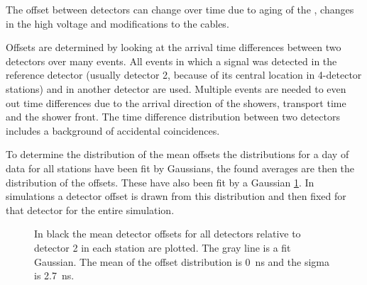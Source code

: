 The offset between detectors can change over time due to aging of the
\pmt, changes in the high voltage and modifications to the cables.

Offsets are determined by looking at the arrival time differences
between two detectors over many events. All events in which a signal was
detected in the reference detector (usually detector 2, because of its
central location in 4-detector stations) and in another detector are
used. Multiple events are needed to even out time differences due to the
arrival direction of the showers, transport time and the shower front.
The time difference distribution between two detectors includes a
background of accidental coincidences.

To determine the distribution of the mean offsets the distributions for
a day of data for all stations have been fit by Gaussians, the found
averages are then the distribution of the offsets. These have also been
fit by a Gaussian \cref{fig:detector_offset_distribution}. In
simulations a detector offset is drawn from this distribution and then
fixed for that detector for the entire simulation.


\begin{figure}
    \centering
    
    \caption{ In black the mean
             detector offsets for all detectors relative to detector 2
             in each station are plotted. The gray line is a fit
             Gaussian. The mean of the offset distribution is
             \SI{0}{\ns} and the sigma is
             \SI{2.7}{\ns}.}
    \label{fig:detector_offset_distribution}
\end{figure}


